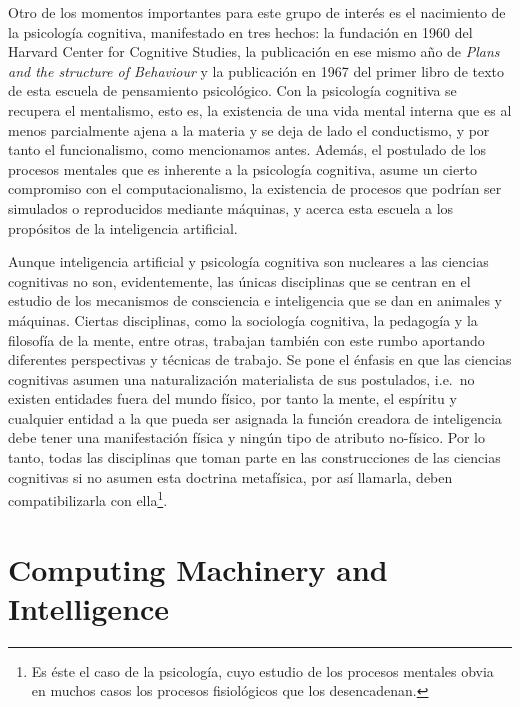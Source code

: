 \documentclass[12pt]{memoir}
\begin{document}
Otro de los momentos importantes para este grupo de interés es el nacimiento de la psicología cognitiva, manifestado en tres hechos: la fundación en 1960 del Harvard Center for Cognitive Studies, la publicación en ese mismo año de \textit{Plans and the structure of Behaviour} y la publicación en 1967 del primer libro de texto de esta escuela de pensamiento psicológico. Con la psicología cognitiva se recupera el mentalismo, esto es, la existencia de una vida mental interna que es al menos parcialmente ajena a la materia y se deja de lado el conductismo, y por tanto el funcionalismo, como mencionamos antes. Además, el postulado de los procesos mentales que es inherente a la psicología cognitiva, asume un cierto compromiso con el computacionalismo, la existencia de procesos que podrían ser simulados o reproducidos mediante máquinas, y acerca esta escuela a los propósitos de la inteligencia artificial.

Aunque inteligencia artificial y psicología cognitiva son nucleares a las ciencias cognitivas no son, evidentemente, las únicas disciplinas que se centran en el estudio de los mecanismos de consciencia e inteligencia que se dan en animales y máquinas. Ciertas disciplinas, como la sociología cognitiva, la pedagogía y la filosofía de la mente, entre otras, trabajan también con este rumbo aportando diferentes perspectivas y técnicas de trabajo. Se pone el énfasis en que las ciencias cognitivas asumen una naturalización materialista de sus postulados, i.e.\ no existen entidades fuera del mundo físico, por tanto la mente, el espíritu y cualquier entidad a la que pueda ser asignada la función creadora de inteligencia debe tener una manifestación física y ningún tipo de atributo no-físico. Por lo tanto, todas las disciplinas que toman parte en las construcciones de las ciencias cognitivas si no asumen esta doctrina metafísica, por así llamarla, deben compatibilizarla con ella\footnote{Es éste el caso de la psicología, cuyo estudio de los procesos mentales obvia en muchos casos los procesos fisiológicos que los desencadenan.}.

\section{Computing Machinery and Intelligence}
\end{document}

